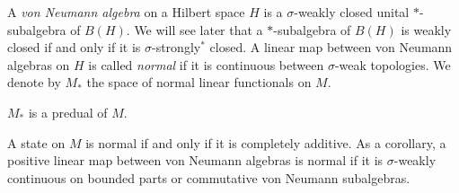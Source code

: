 \documentclass{../../large}
\begin{document}
\begin{prb}
A \emph{von Neumann algebra} on a Hilbert space $H$ is a $\sigma$-weakly closed unital $*$-subalgebra of $B(H)$.
We will see later that a $*$-subalgebra of $B(H)$ is weakly closed if and only if it is $\sigma$-strongly$^*$ closed.
A linear map between von Neumann algebras on $H$ is called \emph{normal} if it is continuous between $\sigma$-weak topologies.
We denote by $M_*$ the space of normal linear functionals on $M$.
\begin{parts}
\item $M_*$ is a predual of $M$.
\item A state on $M$ is normal if and only if it is completely additive.
As a corollary, a positive linear map between von Neumann algebras is normal if it is $\sigma$-weakly continuous on bounded parts or commutative von Neumann subalgebras.
\end{parts}
\end{prb}
\end{document}
